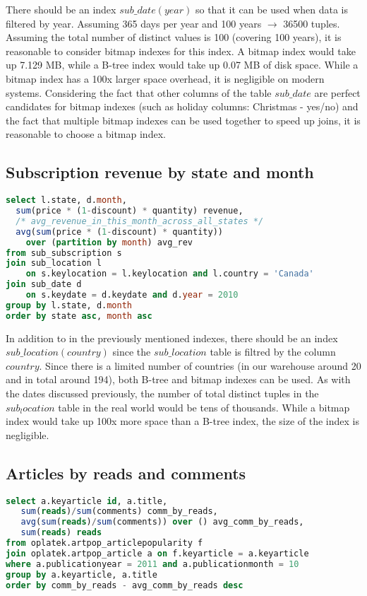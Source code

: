 There should be an index $sub\_date(year)$ so that it can be used when data is filtered by year. Assuming 365 days per year and 100 years $\rightarrow$ 36500 tuples. Assuming the total number of distinct values is 100 (covering 100 years), it is reasonable to consider bitmap indexes for this index. A bitmap index would take up 7.129 MB, while a B-tree index would take up 0.07 MB of disk space. While a bitmap index has a 100x larger space overhead, it is negligible on modern systems. Considering the fact that other columns of the table $sub\_date$ are perfect candidates for bitmap indexes (such as holiday columns: Christmas - yes/no) and the fact that multiple bitmap indexes can be used together to speed up joins, it is reasonable to choose a bitmap index.

\subsection*{Subscription revenue by state and month} 
\begin{lstlisting}[language=sql] 
select l.state, d.month, 
  sum(price * (1-discount) * quantity) revenue,
  /* avg_revenue_in_this_month_across_all_states */
  avg(sum(price * (1-discount) * quantity)) 
    over (partition by month) avg_rev 
from sub_subscription s 
join sub_location l 
    on s.keylocation = l.keylocation and l.country = 'Canada' 
join sub_date d 
    on s.keydate = d.keydate and d.year = 2010
group by l.state, d.month
order by state asc, month asc
\end{lstlisting}

In addition to in the previously mentioned indexes, there should be an index $sub\_location(country)$ since the $sub\_location$ table is filtred by the column $country$. Since there is a limited number of countries (in our warehouse around 20 and in total around 194), both B-tree and bitmap indexes can be used. As with the dates discussed previously, the number of total distinct tuples in the $sub_location$ table in the real world would be tens of thousands. While a bitmap index would take up 100x more space than a B-tree index, the size of the index is negligible.

\subsection*{Articles by reads and comments} 
\begin{lstlisting}[language=sql] 
select a.keyarticle id, a.title,
   sum(reads)/sum(comments) comm_by_reads,
   avg(sum(reads)/sum(comments)) over () avg_comm_by_reads,
   sum(reads) reads
from oplatek.artpop_articlepopularity f
join oplatek.artpop_article a on f.keyarticle = a.keyarticle
where a.publicationyear = 2011 and a.publicationmonth = 10
group by a.keyarticle, a.title
order by comm_by_reads - avg_comm_by_reads desc
\end{lstlisting}


